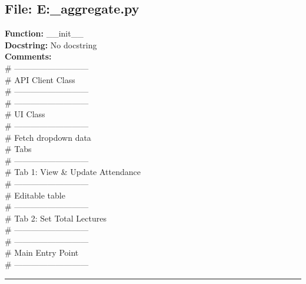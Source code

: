 {\subsection*{File: E:\project\capstone\frontend\faculty\attendance_aggregate.py}
\textbf{Function:} __init__\\
\textbf{Docstring:} No docstring\\
\textbf{Comments:}\\
# ---------------------------\\
# API Client Class\\
# ---------------------------\\
# ---------------------------\\
# UI Class\\
# ---------------------------\\
# Fetch dropdown data\\
# Tabs\\
# ---------------------------\\
# Tab 1: View & Update Attendance\\
# ---------------------------\\
# Editable table\\
# ---------------------------\\
# Tab 2: Set Total Lectures\\
# ---------------------------\\
# ---------------------------\\
# Main Entry Point\\
# ---------------------------\\

\hrule

}
